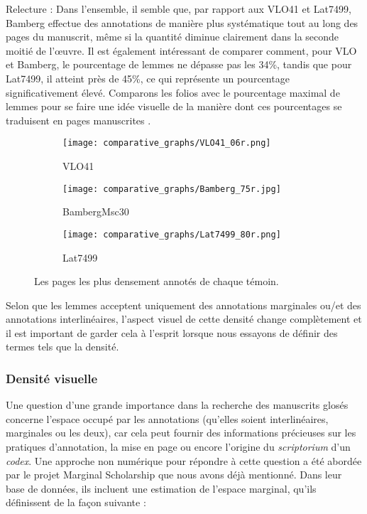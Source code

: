 \documentclass[a4paper, twoside, 12pt]{book}
\begin{document}
{Relecture : Dans l'ensemble, il semble que, par rapport aux VLO41 et Lat7499, Bamberg effectue des annotations de manière plus systématique tout au long des pages du manuscrit, même si la quantité diminue clairement dans la seconde moitié de l'œuvre. Il est également intéressant de comparer comment, pour VLO et Bamberg, le pourcentage de lemmes ne dépasse pas les 34\%, tandis que pour Lat7499, il atteint près de 45\%, ce qui représente un pourcentage significativement élevé. Comparons les folios avec le pourcentage maximal de lemmes pour se faire une idée visuelle de la manière dont ces pourcentages se traduisent en \og{} pages manuscrites \fg{}.\\


\begin{figure}[H]
  \centering
\begin{subfigure}[b]{4.5cm}
\centering
    \texttt{[image: comparative\_graphs/VLO41\_06r.png]}
    \caption{VLO41}
  \end{subfigure}%
  \hspace{0.5cm}
  \begin{subfigure}[b]{4.5cm}
  \centering
    \texttt{[image: comparative\_graphs/Bamberg\_75r.jpg]}
    \caption{BambergMsc30}
  \end{subfigure}%
  \hspace{0.5cm}
  \begin{subfigure}[b]{4.5cm}
    \texttt{[image: comparative\_graphs/Lat7499\_80r.png]}
    \caption{Lat7499}
  \end{subfigure}
  \caption{Les pages les plus densement annotés de chaque témoin.}
  \label{fig:boxplotslemmas}
\end{figure}

Selon que les lemmes acceptent uniquement des annotations marginales ou/et des annotations interlinéaires, l'aspect visuel de cette densité change complètement et il est important de garder cela à l'esprit lorsque nous essayons de définir des termes tels que la \og{}densité\fg{}.

\subsubsection{Densité visuelle}

Une question d'une grande importance dans la recherche des manuscrits glosés concerne l'espace occupé par les annotations (qu'elles soient interlinéaires, marginales ou les deux), car cela peut fournir des informations précieuses sur les pratiques d'annotation, la mise en page ou encore l'origine du \textit{scriptorium} d'un \textit{codex}. Une approche non numérique pour répondre à cette question a été abordée par le projet \og{}Marginal Scholarship\fg{} que nous avons déjà mentionné. Dans leur base de données, ils incluent une estimation de l'espace marginal, qu'ils définissent de la façon suivante :\\


}
\end{document}
